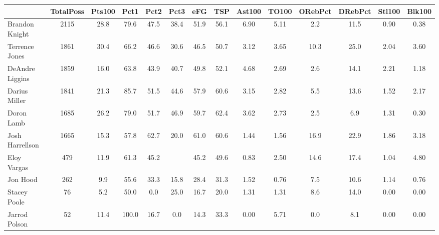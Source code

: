 \documentclass[10pt,letterpaper]{article}
\begin{document}
\begin{table}[ht]
\begin{center}
\begin{tabular}{lccccccccccccc}
  \hline
 & TotalPoss & Pts100 & Pct1 & Pct2 & Pct3 & eFG & TSP & Ast100 & TO100 & ORebPct & DRebPct & Stl100 & Blk100 \\ 
  \hline
Brandon Knight & 2115 & 28.8 & 79.6 & 47.5 & 38.4 & 51.9 & 56.1 & 6.90 & 5.11 & 2.2 & 11.5 & 0.90 & 0.38 \\ 
  Terrence Jones & 1861 & 30.4 & 66.2 & 46.6 & 30.6 & 46.5 & 50.7 & 3.12 & 3.65 & 10.3 & 25.0 & 2.04 & 3.60 \\ 
  DeAndre Liggins & 1859 & 16.0 & 63.8 & 43.9 & 40.7 & 49.8 & 52.1 & 4.68 & 2.69 & 2.6 & 14.1 & 2.21 & 1.18 \\ 
  Darius Miller & 1841 & 21.3 & 85.7 & 51.5 & 44.6 & 57.9 & 60.6 & 3.15 & 2.82 & 5.5 & 13.6 & 1.52 & 2.17 \\ 
  Doron Lamb & 1685 & 26.2 & 79.0 & 51.7 & 46.9 & 59.7 & 62.4 & 3.62 & 2.73 & 2.5 & 6.9 & 1.31 & 0.30 \\ 
  Josh Harrellson & 1665 & 15.3 & 57.8 & 62.7 & 20.0 & 61.0 & 60.6 & 1.44 & 1.56 & 16.9 & 22.9 & 1.86 & 3.18 \\ 
  Eloy Vargas & 479 & 11.9 & 61.3 & 45.2 &  & 45.2 & 49.6 & 0.83 & 2.50 & 14.6 & 17.4 & 1.04 & 4.80 \\ 
  Jon Hood & 262 & 9.9 & 55.6 & 33.3 & 15.8 & 28.4 & 31.3 & 1.52 & 0.76 & 7.5 & 10.6 & 1.14 & 0.76 \\ 
  Stacey Poole & 76 & 5.2 & 50.0 & 0.0 & 25.0 & 16.7 & 20.0 & 1.31 & 1.31 & 8.6 & 14.0 & 0.00 & 0.00 \\ 
  Jarrod Polson & 52 & 11.4 & 100.0 & 16.7 & 0.0 & 14.3 & 33.3 & 0.00 & 5.71 & 0.0 & 8.1 & 0.00 & 0.00 \\ 
   \hline
\end{tabular}
\end{center}
\end{table}
\end{document}
